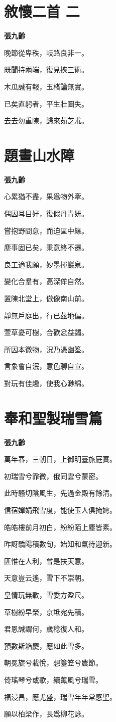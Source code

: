 \documentclass[12pt,a4paper]{ctexbook}
\begin{document}
\section{敘懷二首 二}
\textbf{張九齡}\par\vspace{0.5em}
晚節從卑秩，岐路良非一。\par
既聞持兩端，復見挾三術。\par
木瓜誠有報，玉楮論無實。\par
已矣直躬者，平生壯圖失。\par
去去勿重陳，歸來茹芝朮。\par

\section{題畫山水障}
\textbf{張九齡}\par\vspace{0.5em}
心累猶不盡，果爲物外牽。\par
偶因耳目好，復假丹青妍。\par
嘗抱野間意，而迫區中緣。\par
塵事固已矣，秉意終不遷。\par
良工適我願，妙墨揮巖泉。\par
變化合羣有，高深侔自然。\par
置陳北堂上，倣像南山前。\par
靜無戶庭出，行已茲地偏。\par
萱草憂可樹，合歡忿益蠲。\par
所因本微物，況乃憑幽筌。\par
言象會自泯，意色聊自宣。\par
對玩有佳趣，使我心渺綿。\par

\section{奉和聖製瑞雪篇}
\textbf{張九齡}\par\vspace{0.5em}
萬年春，三朝日，上御明臺旅庭實。\par
初瑞雪兮霏微，俄同雲兮蒙密。\par
此時騷切陰風生，先過金殿有餘清。\par
信宿嬋娟飛雪度，能使玉人俱掩嫮。\par
皓皓樓前月初白，紛紛陌上塵皆素。\par
昨訝驕陽積數旬，始知和氣待迎新。\par
匪惟在人利，曾是扶天意。\par
天意豈云遙，雪下不崇朝。\par
皇情玩無斁，雪委方盈尺。\par
草樹紛早榮，京坻宛先積。\par
君恩誠謂何，歲稔復人和。\par
預數斯箱慶，應如此雪多。\par
朝冕旒兮載悅，想籉笠兮農節。\par
倚瑤琴兮或歌，續薰風兮瑞雪。\par
福浸昌，應尤盛，瑞雪年年常感聖。\par
願以柏梁作，長爲柳花詠。\par
\end{document}
